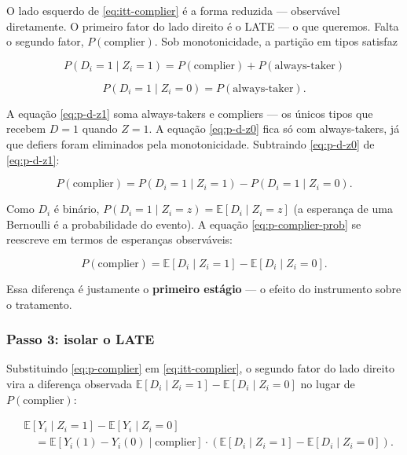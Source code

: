 \documentclass[
]{article}
\begin{document}
O lado esquerdo de \eqref{eq:itt-complier} é a forma reduzida --- observável diretamente. O primeiro fator do lado direito é o LATE --- o que queremos. Falta o segundo fator, \(P(\text{complier})\). Sob monotonicidade, a partição em tipos satisfaz

\begin{equation}
P(D_i = 1 \mid Z_i = 1) = P(\text{complier}) + P(\text{always-taker})
\label{eq:p-d-z1}
\end{equation}

\begin{equation}
P(D_i = 1 \mid Z_i = 0) = P(\text{always-taker}).
\label{eq:p-d-z0}
\end{equation}

A equação \eqref{eq:p-d-z1} soma always-takers e compliers --- os únicos tipos que recebem \(D = 1\) quando \(Z = 1\). A equação \eqref{eq:p-d-z0} fica só com always-takers, já que defiers foram eliminados pela monotonicidade. Subtraindo \eqref{eq:p-d-z0} de \eqref{eq:p-d-z1}:

\begin{equation}
P(\text{complier}) = P(D_i = 1 \mid Z_i = 1) - P(D_i = 1 \mid Z_i = 0).
\label{eq:p-complier-prob}
\end{equation}

Como \(D_i\) é binário, \(P(D_i = 1 \mid Z_i = z) = \mathbb{E}[D_i \mid Z_i = z]\) (a esperança de uma Bernoulli é a probabilidade do evento). A equação \eqref{eq:p-complier-prob} se reescreve em termos de esperanças observáveis:

\begin{equation}
P(\text{complier}) = \mathbb{E}[D_i \mid Z_i = 1] - \mathbb{E}[D_i \mid Z_i = 0].
\label{eq:p-complier}
\end{equation}

Essa diferença é justamente o \textbf{primeiro estágio} --- o efeito do instrumento sobre o tratamento.

\subsubsection{Passo 3: isolar o LATE}\label{passo-3-isolar-o-late}

Substituindo \eqref{eq:p-complier} em \eqref{eq:itt-complier}, o segundo fator do lado direito vira a diferença observada \(\mathbb{E}[D_i \mid Z_i = 1] - \mathbb{E}[D_i \mid Z_i = 0]\) no lugar de \(P(\text{complier})\):

\begin{equation}
\begin{aligned}
&\mathbb{E}[Y_i \mid Z_i = 1] - \mathbb{E}[Y_i \mid Z_i = 0] \\
&\quad = \mathbb{E}[Y_i(1) - Y_i(0) \mid \text{complier}] \cdot \left( \mathbb{E}[D_i \mid Z_i = 1] - \mathbb{E}[D_i \mid Z_i = 0] \right).
\end{aligned}
\label{eq:itt-first-stage}
\end{equation}
\end{document}
